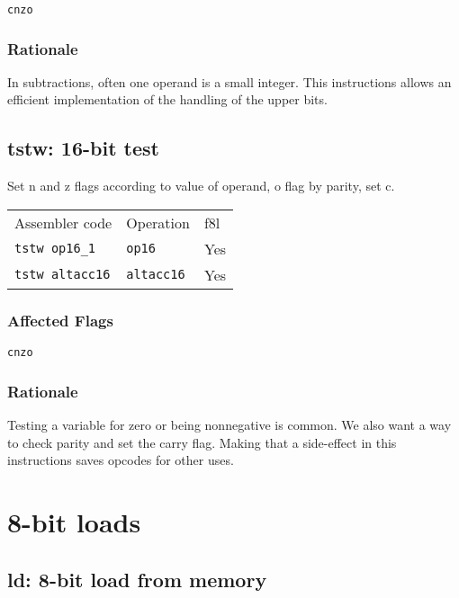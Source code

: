 \documentclass{book}
\begin{document}
\texttt{cnzo}

\subsubsection*{Rationale}

In subtractions, often one operand is a small integer. This instructions allows an efficient implementation of the handling of the upper bits.


\subsection{tstw: 16-bit test}

Set n and z flags according to value of operand, o flag by parity, set c.

\begin{tabular}{l l l}
Assembler code         & Operation         & f8l \\
\texttt{tstw op16\_1}  & \texttt{op16}     & Yes \\
\texttt{tstw altacc16} & \texttt{altacc16} & Yes
\end{tabular}

\subsubsection*{Affected Flags}

\texttt{cnzo}

\subsubsection*{Rationale}

Testing a variable for zero or being nonnegative is common. We also want a way to check parity and set the carry flag. Making that a side-effect in this instructions saves opcodes for other uses.


\section{8-bit loads}

\subsection{ld: 8-bit load from memory}
\end{document}
